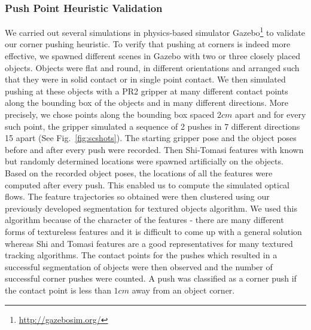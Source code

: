 \subsubsection{Push Point Heuristic Validation}
We carried  out several simulations  in physics-based simulator Gazebo\footnote{\url{http://gazebosim.org/}} to validate  our corner
pushing heuristic. To verify that  pushing at corners is  indeed more
effective, we  spawned different  scenes in Gazebo  with two  or three
closely  placed objects. Objects were flat and round, in different orientations 
and arranged such that they were in solid contact or in single point contact.
We  then simulated  pushing at  these objects
with a PR2 gripper at many different contact points along the bounding
box of the  objects and in many different  directions. More precisely,
we chose points along the bounding box spaced $2cm$ apart and for every
such  point,  the  gripper simulated  a  sequence  of  2 pushes  in  7
different directions {15\textdegree}  apart (See Fig.~\ref{fig:scshots}). The starting gripper pose
and the object  poses before and after every  push were recorded. Then
Shi-Tomasi features with known but randomly determined  locations were spawned artificially on
the objects. Based on the  recorded object poses, the locations of all
the  features were  computed  after  every push.  This  enabled us  to
compute the simulated optical flows. The feature trajectories  so obtained were
then clustered using our previously developed segmentation for textured objects algorithm.
We used this algorithm because of the character of the features - there are many different forms of textureless features and it is difficult to come up with a general solution whereas Shi and Tomasi features are a good representatives for many textured tracking algorithms.  The contact points for the
pushes  which resulted in  a successful  segmentation of  objects were
then  observed  and  the  number  of  successful  corner  pushes  were
counted. A push  was classified as a corner push  if the contact point
is less than $1cm$ away from an object corner.

